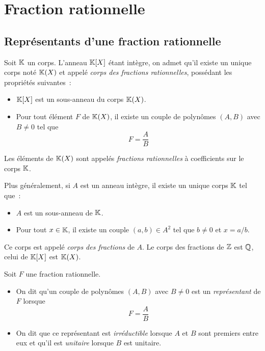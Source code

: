 \documentclass{magnolia}
\begin{document}
\magtoc

\section{Fraction rationnelle}
\subsection{Représentants d'une fraction rationnelle}
\begin{definition}
Soit $\mathbb{K}$ un corps. L'anneau $\polyK$ étant intègre, on admet qu'il existe
un unique corps noté $\fracK$ et appelé \emph{corps des fractions
rationnelles}, possédant les propriétés suivantes~:
\begin{itemize}
\item $\polyK$ est un sous-anneau du corps $\fracK$.
\item Pour tout élément $F$ de $\fracK$, il existe un couple de polynômes
  $(A,B)$ avec $B\not=0$ tel que
  \[F=\frac{A}{B}\]
\end{itemize}
Les éléments de $\fracK$ sont appelés \emph{fractions rationnelles} à
coefficients sur le corps $\mathbb{K}$.
\end{definition}

\begin{remarqueUnique}
\remarque Plus généralement, si $A$ est un anneau intègre, il existe un unique
  corps $\mathbb{K}$ tel que~:
  \begin{itemize}
  \item $A$ est un sous-anneau de $\mathbb{K}$.
  \item Pour tout $x\in\mathbb{K}$, il existe un couple $(a,b)\in A^2$ tel que $b\neq 0$ et $x=a/b$.
  \end{itemize}
  Ce corps est appelé \emph{corps des fractions} de $A$. Le corps des fractions de $\mathbb{Z}$ est $\mathbb{Q}$, celui
  de $\polyK$ est $\fracK$.
\end{remarqueUnique}

\begin{definition}
Soit $F$ une fraction rationnelle.
\begin{itemize}
\item On dit qu'un couple de polynômes $(A,B)$ avec $B\not=0$ est un
  \emph{représentant} de $F$ lorsque
  \[F=\frac{A}{B}\]
\item On dit que ce représentant est \emph{irréductible} lorsque $A$ et $B$
  sont premiers entre eux et qu'il est \emph{unitaire} lorsque $B$ est unitaire.
\end{itemize}
\end{definition}
\end{document}
